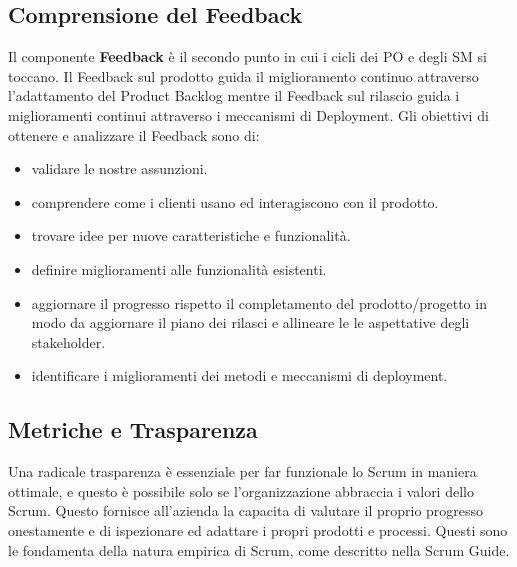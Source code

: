 \documentclass[12pt,a4paper,parskip=full]{scrartcl}
\begin{document}
\subsection{Comprensione del Feedback}
Il componente \textbf{Feedback} è il secondo punto in cui i cicli dei PO e degli SM 
si toccano. Il Feedback sul prodotto guida il miglioramento continuo attraverso l'adattamento del Product Backlog mentre il Feedback sul rilascio guida i miglioramenti continui attraverso i meccanismi di Deployment. Gli obiettivi di ottenere e analizzare il Feedback sono di:
\begin{itemize}
\item validare le nostre assunzioni.
\item comprendere come i clienti usano ed interagiscono con il prodotto.
\item trovare idee per nuove caratteristiche e funzionalità.
\item definire miglioramenti alle funzionalità esistenti.
\item aggiornare il progresso rispetto il completamento del prodotto/progetto in modo
da aggiornare il piano dei rilasci e allineare le le aspettative degli stakeholder.
\item identificare i miglioramenti dei metodi e meccanismi di deployment.
\end{itemize}

\subsection{Metriche e Trasparenza}
Una radicale trasparenza è essenziale per far funzionale lo Scrum in maniera ottimale,
e questo è possibile solo se l'organizzazione abbraccia i valori dello Scrum.
Questo fornisce all'azienda la capacita di valutare il proprio progresso onestamente
e di ispezionare ed adattare i propri prodotti e processi. Questi sono le fondamenta
della natura empirica di Scrum, come descritto nella Scrum Guide.
\end{document}
